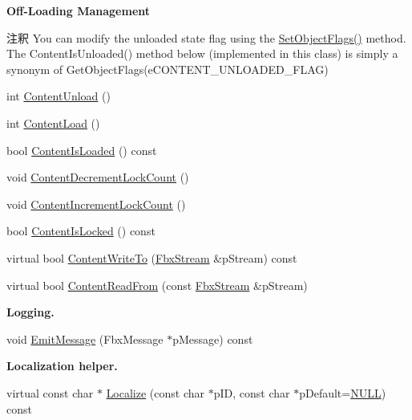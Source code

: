 \begin{Indent}\textbf{ Off-\/\+Loading Management}\par
{\em \begin{DoxyRemark}{注釈}
You can modify the unloaded state flag using the \hyperlink{class_fbx_object_a38333e180ca371f76495267a26cccb08}{Set\+Object\+Flags()} method. The Content\+Is\+Unloaded() method below (implemented in this class) is simply a synonym of Get\+Object\+Flags(e\+C\+O\+N\+T\+E\+N\+T\+\_\+\+U\+N\+L\+O\+A\+D\+E\+D\+\_\+\+F\+L\+A\+G) 
\end{DoxyRemark}
}\begin{DoxyCompactItemize}
\item 
int \hyperlink{class_fbx_object_ac28653a3c65e840498eebfb54276e483}{Content\+Unload} ()
\item 
int \hyperlink{class_fbx_object_a296d454c59bd93245dd5e2312dc7f165}{Content\+Load} ()
\item 
bool \hyperlink{class_fbx_object_ac1e5a81afa5c74aec67c57136b541161}{Content\+Is\+Loaded} () const
\item 
void \hyperlink{class_fbx_object_a7720b36c508a8c32c9cf72a7a59f5c3e}{Content\+Decrement\+Lock\+Count} ()
\item 
void \hyperlink{class_fbx_object_a83ebb7c4a09328e517a4b5367fcf8c0d}{Content\+Increment\+Lock\+Count} ()
\item 
bool \hyperlink{class_fbx_object_ad9e3373b45e2fbce5a7a11a09edd96f7}{Content\+Is\+Locked} () const
\item 
virtual bool \hyperlink{class_fbx_object_ab8a59df9233cdfeaae05e5b6d15f5101}{Content\+Write\+To} (\hyperlink{class_fbx_stream}{Fbx\+Stream} \&p\+Stream) const
\item 
virtual bool \hyperlink{class_fbx_object_aeb4255bda633e1986730748758a7cf6c}{Content\+Read\+From} (const \hyperlink{class_fbx_stream}{Fbx\+Stream} \&p\+Stream)
\end{DoxyCompactItemize}
\end{Indent}
\begin{Indent}\textbf{ Logging.}\par
\begin{DoxyCompactItemize}
\item 
void \hyperlink{class_fbx_object_ae2fe13bc65c1ffe2c2338bc2a2740429}{Emit\+Message} (Fbx\+Message $\ast$p\+Message) const
\end{DoxyCompactItemize}
\end{Indent}
\begin{Indent}\textbf{ Localization helper.}\par
\begin{DoxyCompactItemize}
\item 
virtual const char $\ast$ \hyperlink{class_fbx_object_a9b8ae43ccdd09be07b450e0ed54788ab}{Localize} (const char $\ast$p\+ID, const char $\ast$p\+Default=\hyperlink{fbxarch_8h_a070d2ce7b6bb7e5c05602aa8c308d0c4}{N\+U\+LL}) const
\end{DoxyCompactItemize}
\end{Indent}
